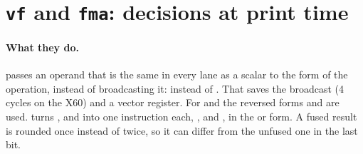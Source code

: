 \section{\texttt{vf} and \texttt{fma}: decisions at print time}\label{r04:sec:ext-vf-fma}

\paragraph{What they do.}  passes an operand that is the same in every lane as
a scalar to the  form of the operation, instead of broadcasting it:
 instead of .
That saves the broadcast (4 cycles on the X60) and a vector register. For
 and  the reversed forms  and 
are used.  turns ,  and  into one
instruction each, ,  and , in the
 or  form. A fused result is rounded once instead of twice, so
it can differ from the unfused one in the last bit.

